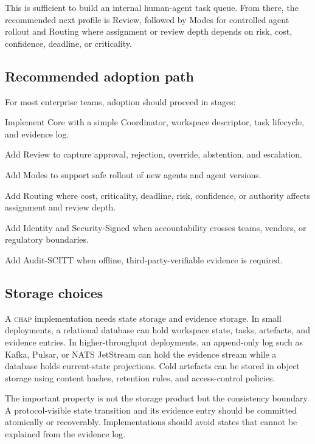 \documentclass[11pt]{article}
\newcommand{\chap}{\textsc{chap}}
\begin{document}
This is sufficient to build an internal human-agent task queue. From there, the recommended next profile is Review, followed by Modes for controlled agent rollout and Routing where assignment or review depth depends on risk, cost, confidence, deadline, or criticality.

\subsection{Recommended adoption path}

For most enterprise teams, adoption should proceed in stages:

\begin{description}[leftmargin=!,labelwidth=1.7cm]
    \item[Stage 1] Implement Core with a simple Coordinator, workspace descriptor, task lifecycle, and evidence log.
    \item[Stage 2] Add Review to capture approval, rejection, override, abstention, and escalation.
    \item[Stage 3] Add Modes to support safe rollout of new agents and agent versions.
    \item[Stage 4] Add Routing where cost, criticality, deadline, risk, confidence, or authority affects assignment and review depth.
    \item[Stage 5] Add Identity and Security-Signed when accountability crosses teams, vendors, or regulatory boundaries.
    \item[Stage 6] Add Audit-SCITT when offline, third-party-verifiable evidence is required.
\end{description}

\subsection{Storage choices}

A \chap{} implementation needs state storage and evidence storage. In small deployments, a relational database can hold workspace state, tasks, artefacts, and evidence entries. In higher-throughput deployments, an append-only log such as Kafka, Pulsar, or NATS JetStream can hold the evidence stream while a database holds current-state projections. Cold artefacts can be stored in object storage using content hashes, retention rules, and access-control policies.

The important property is not the storage product but the consistency boundary. A protocol-visible state transition and its evidence entry should be committed atomically or recoverably. Implementations should avoid states that cannot be explained from the evidence log.
\end{document}
